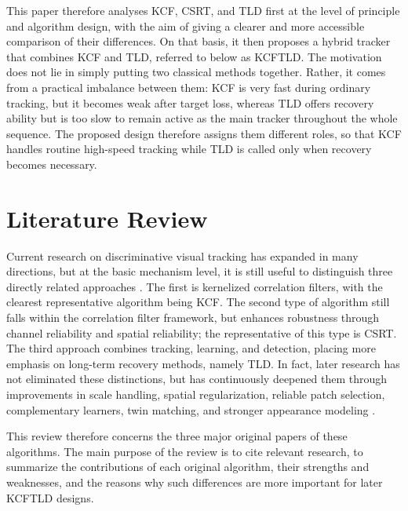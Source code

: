 \documentclass[12pt,a4paper]{article}
\begin{document}
This paper therefore analyses KCF, CSRT, and TLD first at the level of principle and algorithm design, with the aim of giving a clearer and more accessible comparison of their differences. On that basis, it then proposes a hybrid tracker that combines KCF and TLD, referred to below as KCF\textendash TLD. The motivation does not lie in simply putting two classical methods together. Rather, it comes from a practical imbalance between them: KCF is very fast during ordinary tracking, but it becomes weak after target loss, whereas TLD offers recovery ability but is too slow to remain active as the main tracker throughout the whole sequence. The proposed design therefore assigns them different roles, so that KCF handles routine high-speed tracking while TLD is called only when recovery becomes necessary.

\section{Literature Review}
Current research on discriminative visual tracking has expanded in many directions, but at the basic mechanism level, it is still useful to distinguish three directly related approaches \cite{smeulders2014survey}. The first is kernelized correlation filters, with the clearest representative algorithm being KCF. The second type of algorithm still falls within the correlation filter framework, but enhances robustness through channel reliability and spatial reliability; the representative of this type is CSRT. The third approach combines tracking, learning, and detection, placing more emphasis on long-term recovery methods, namely TLD. In fact, later research has not eliminated these distinctions, but has continuously deepened them through improvements in scale handling, spatial regularization, reliable patch selection, complementary learners, twin matching, and stronger appearance modeling \cite{bibi2015multitemplate,danelljan2015srdcf,zhang2014stc,li2015reliablepatch,bertinetto2016staple,bertinetto2016siamfc,guo2017dynamicsiamese,danelljan2017eco,gao2019deeprelative,danelljan2019atom,kristan2019vot}.

This review therefore concerns the three major original papers of these algorithms. The main purpose of the review is to cite relevant research, to summarize the contributions of each original algorithm, their strengths and weaknesses, and the reasons why such differences are more important for later KCF\textendash TLD designs.
\end{document}
